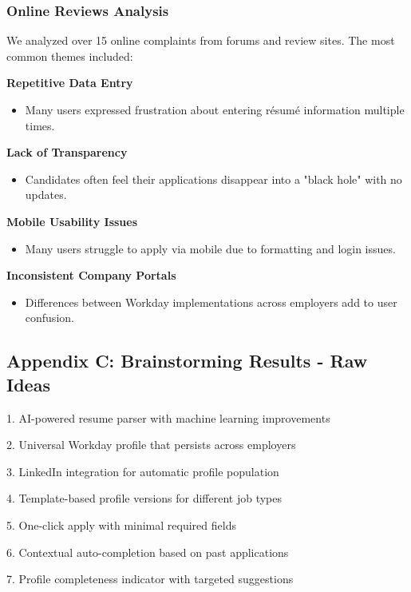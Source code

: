 \documentclass[
	letterpaper, %
]{jdf}
\begin{document}
\subsubsection*{Online Reviews Analysis}  

We analyzed over 15 online complaints from forums and review sites. The most common themes included:  

\textbf{Repetitive Data Entry}  
\begin{itemize}  
    \item Many users expressed frustration about entering résumé information multiple times.  
\end{itemize}   

\textbf{Lack of Transparency}  
\begin{itemize}  
    \item Candidates often feel their applications disappear into a "black hole" with no updates.  
\end{itemize}   

\textbf{Mobile Usability Issues}  
\begin{itemize}  
    \item Many users struggle to apply via mobile due to formatting and login issues.  
\end{itemize}  

\textbf{Inconsistent Company Portals}  
\begin{itemize}  
    \item Differences between Workday implementations across employers add to user confusion.  
\end{itemize}  


\subsection{Appendix C: Brainstorming Results - Raw Ideas}

1. AI-powered resume parser with machine learning improvements

2. Universal Workday profile that persists across employers

3. LinkedIn integration for automatic profile population

4. Template-based profile versions for different job types

5. One-click apply with minimal required fields

6. Contextual auto-completion based on past applications

7. Profile completeness indicator with targeted suggestions
\end{document}
